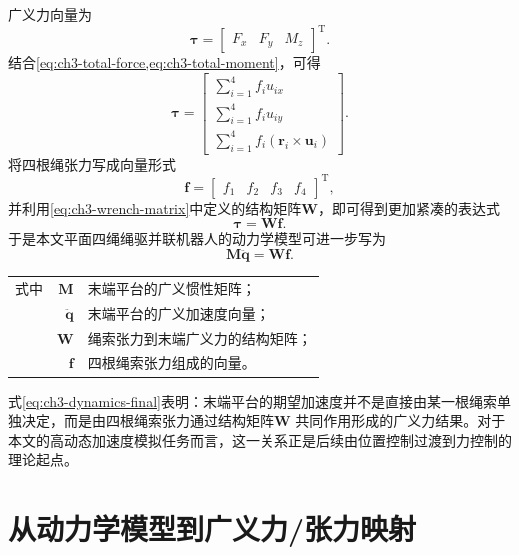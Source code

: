 广义力向量为
\begin{equation}
  \bm \tau= \begin{bmatrix} F_x & F_y & M_z \end{bmatrix}^{\mathrm T}. \label{eq:ch3-generalized-wrench}
\end{equation}
结合\cref{eq:ch3-total-force,eq:ch3-total-moment}，可得
\begin{equation}
  \bm \tau=
  \begin{bmatrix}
    \sum_{i=1}^{4} f_i u_{ix} \\
    \sum_{i=1}^{4} f_i u_{iy} \\
    \sum_{i=1}^{4} f_i(\bm r_i\times\bm u_i)
  \end{bmatrix}.
  \label{eq:ch3-wrench-expand}
\end{equation}
将四根绳张力写成向量形式
\begin{equation}
  \bm f= \begin{bmatrix} f_1 & f_2 & f_3 & f_4 \end{bmatrix}^{\mathrm T}, \label{eq:ch3-force-vector}
\end{equation}
并利用\cref{eq:ch3-wrench-matrix}中定义的结构矩阵$\bm W$，即可得到更加紧凑的表达式
\begin{equation}
  \bm \tau=\bm W\bm f. \label{eq:ch3-wrench-map}
\end{equation}
于是本文平面四绳绳驱并联机器人的动力学模型可进一步写为
\begin{equation}
  \bm M\ddot{\bm q}=\bm W\bm f. \label{eq:ch3-dynamics-final}
\end{equation}
\begin{tabularx}{\textwidth}{@{}l@{\quad}r@{———}X@{}}
  式中 & $\bm M$ & 末端平台的广义惯性矩阵；\\
       & $\ddot{\bm q}$ & 末端平台的广义加速度向量；\\
       & $\bm W$ & 绳索张力到末端广义力的结构矩阵；\\
       & $\bm f$ & 四根绳索张力组成的向量。
\end{tabularx}
式\eqref{eq:ch3-dynamics-final}表明：末端平台的期望加速度并不是直接由某一根绳索单独决定，而是由四根绳索张力通过结构矩阵$\bm W$ 共同作用形成的广义力结果。对于本文的高动态加速度模拟任务而言，这一关系正是后续由位置控制过渡到力控制的理论起点。

\section{从动力学模型到广义力/张力映射}

